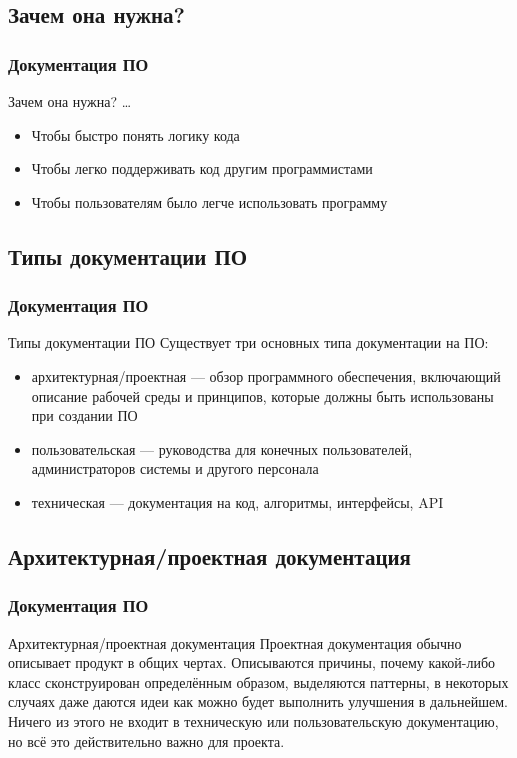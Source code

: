 \documentclass{../industrial-development}
\begin{document}
\subsection{Зачем она нужна?}
\begin{frame} \frametitle{Документация ПО}
  \begin{block}{Зачем она нужна?}
\dots
  \end{block}
  
  \begin{itemize}
  \item Чтобы быстро понять логику кода
  \item Чтобы легко поддерживать код другим программистами
  \item Чтобы пользователям было легче использовать программу
  \end{itemize}
\end{frame}

\subsection{Типы документации ПО}
\begin{frame} \frametitle{Документация ПО}
  \begin{block}{Типы документации ПО}
Существует три основных типа документации на ПО: 
  \end{block}
  \begin{itemize}
  \item архитектурная/проектная — обзор программного обеспечения, включающий описание рабочей среды и принципов, которые должны быть использованы при создании ПО
  \item пользовательская — руководства для конечных пользователей, администраторов системы и другого персонала
  \item техническая — документация на код, алгоритмы, интерфейсы, API
  \end{itemize}
\end{frame}

\subsection{Архитектурная/проектная документация}
\begin{frame} \frametitle{Документация ПО}
  \begin{block}{Архитектурная/проектная документация}
 Проектная документация обычно описывает продукт в общих чертах. Описываются причины, почему какой-либо класс сконструирован определённым образом, выделяются паттерны, в некоторых случаях даже даются идеи как можно будет выполнить улучшения в дальнейшем. Ничего из этого не входит в техническую или пользовательскую документацию, но всё это действительно важно для проекта.
  \end{block}
\end{frame}
\end{document}
